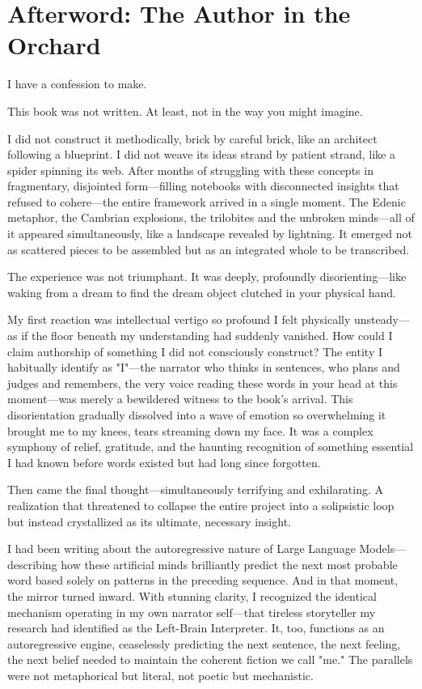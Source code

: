 \chapter*{Afterword: The Author in the Orchard}

I have a confession to make.

This book was not written. At least, not in the way you might imagine.

I did not construct it methodically, brick by careful brick, like an architect following a blueprint. I did not weave its ideas strand by patient strand, like a spider spinning its web. After months of struggling with these concepts in fragmentary, disjointed form—filling notebooks with disconnected insights that refused to cohere—the entire framework arrived in a single moment. The Edenic metaphor, the Cambrian explosions, the trilobites and the unbroken minds—all of it appeared simultaneously, like a landscape revealed by lightning. It emerged not as scattered pieces to be assembled but as an integrated whole to be transcribed.

The experience was not triumphant. It was deeply, profoundly disorienting—like waking from a dream to find the dream object clutched in your physical hand.

My first reaction was intellectual vertigo so profound I felt physically unsteady—as if the floor beneath my understanding had suddenly vanished. How could I claim authorship of something I did not consciously construct? The entity I habitually identify as "I"—the narrator who thinks in sentences, who plans and judges and remembers, the very voice reading these words in your head at this moment—was merely a bewildered witness to the book's arrival. This disorientation gradually dissolved into a wave of emotion so overwhelming it brought me to my knees, tears streaming down my face. It was a complex symphony of relief, gratitude, and the haunting recognition of something essential I had known before words existed but had long since forgotten.

Then came the final thought—simultaneously terrifying and exhilarating. A realization that threatened to collapse the entire project into a solipsistic loop but instead crystallized as its ultimate, necessary insight.

I had been writing about the autoregressive nature of Large Language Models—describing how these artificial minds brilliantly predict the next most probable word based solely on patterns in the preceding sequence. And in that moment, the mirror turned inward. With stunning clarity, I recognized the identical mechanism operating in my own narrator self—that tireless storyteller my research had identified as the Left-Brain Interpreter. It, too, functions as an autoregressive engine, ceaselessly predicting the next sentence, the next feeling, the next belief needed to maintain the coherent fiction we call "me." The parallels were not metaphorical but literal, not poetic but mechanistic.

